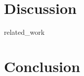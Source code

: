 \documentclass[11pt, a4paper]{article} %
\theoremstyle{definition}
\begin{document}

\section{Discussion}



{related_work}



\section{Conclusion}

\newpage %
\end{document}
